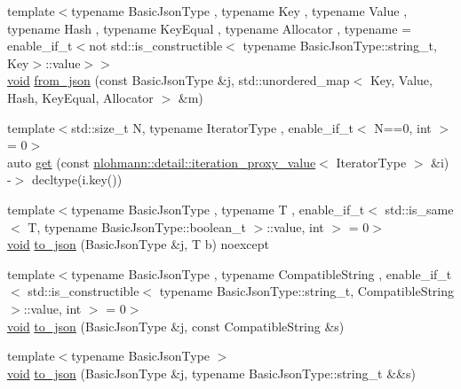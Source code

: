 \begin{DoxyCompactItemize}
\item 
{\footnotesize template$<$typename Basic\+Json\+Type , typename Key , typename Value , typename Hash , typename Key\+Equal , typename Allocator , typename  = enable\+\_\+if\+\_\+t$<$not std\+::is\+\_\+constructible$<$                                     typename Basic\+Json\+Type\+::string\+\_\+t, Key$>$\+::value$>$$>$ }\\\mbox{\hyperlink{namespacenlohmann_1_1detail_a59fca69799f6b9e366710cb9043aa77d}{void}} \mbox{\hyperlink{namespacenlohmann_1_1detail_aef5c8ea108f4d2b03fb4a635617510de}{from\+\_\+json}} (const Basic\+Json\+Type \&j, std\+::unordered\+\_\+map$<$ Key, Value, Hash, Key\+Equal, Allocator $>$ \&m)
\item 
{\footnotesize template$<$std\+::size\+\_\+t N, typename Iterator\+Type , enable\+\_\+if\+\_\+t$<$ N==0, int $>$  = 0$>$ }\\auto \mbox{\hyperlink{namespacenlohmann_1_1detail_acc422c11342b31368f610b6f96fcedc6}{get}} (const \mbox{\hyperlink{classnlohmann_1_1detail_1_1iteration__proxy__value}{nlohmann\+::detail\+::iteration\+\_\+proxy\+\_\+value}}$<$ Iterator\+Type $>$ \&i) -\/$>$ decltype(i.\+key())
\item 
{\footnotesize template$<$typename Basic\+Json\+Type , typename T , enable\+\_\+if\+\_\+t$<$ std\+::is\+\_\+same$<$ T, typename Basic\+Json\+Type\+::boolean\+\_\+t $>$\+::value, int $>$  = 0$>$ }\\\mbox{\hyperlink{namespacenlohmann_1_1detail_a59fca69799f6b9e366710cb9043aa77d}{void}} \mbox{\hyperlink{namespacenlohmann_1_1detail_a1a804b98cbe89b7e44b698f2ca860490}{to\+\_\+json}} (Basic\+Json\+Type \&j, T b) noexcept
\item 
{\footnotesize template$<$typename Basic\+Json\+Type , typename Compatible\+String , enable\+\_\+if\+\_\+t$<$ std\+::is\+\_\+constructible$<$ typename Basic\+Json\+Type\+::string\+\_\+t, Compatible\+String $>$\+::value, int $>$  = 0$>$ }\\\mbox{\hyperlink{namespacenlohmann_1_1detail_a59fca69799f6b9e366710cb9043aa77d}{void}} \mbox{\hyperlink{namespacenlohmann_1_1detail_a7356ed05cdbbb080cee80e1211e1c6c9}{to\+\_\+json}} (Basic\+Json\+Type \&j, const Compatible\+String \&s)
\item 
{\footnotesize template$<$typename Basic\+Json\+Type $>$ }\\\mbox{\hyperlink{namespacenlohmann_1_1detail_a59fca69799f6b9e366710cb9043aa77d}{void}} \mbox{\hyperlink{namespacenlohmann_1_1detail_a4aa1ca6b7c61bf19d1f30ea5b669f68e}{to\+\_\+json}} (Basic\+Json\+Type \&j, typename Basic\+Json\+Type\+::string\+\_\+t \&\&s)

\end{DoxyCompactItemize}
